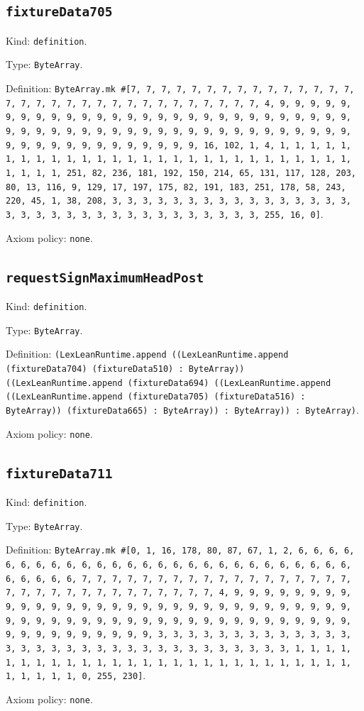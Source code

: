 \documentclass[11pt]{article}
\begin{document}
\subsection*{\texttt{fixtureData705}}
\noindent Kind: \texttt{definition}.\par
\noindent Type: \texttt{ByteArray}.\par
\noindent Definition: \texttt{ByteArray.mk \#[7, 7, 7, 7, 7, 7, 7, 7, 7, 7, 7, 7, 7, 7, 7, 7, 7, 7, 7, 7, 7, 7, 7, 7, 7, 7, 7, 7, 7, 7, 7, 7, 4, 9, 9, 9, 9, 9, 9, 9, 9, 9, 9, 9, 9, 9, 9, 9, 9, 9, 9, 9, 9, 9, 9, 9, 9, 9, 9, 9, 9, 9, 9, 9, 9, 9, 9, 9, 9, 9, 9, 9, 9, 9, 9, 9, 9, 9, 9, 9, 9, 9, 9, 9, 9, 9, 9, 9, 9, 9, 9, 9, 9, 9, 9, 9, 9, 16, 102, 1, 4, 1, 1, 1, 1, 1, 1, 1, 1, 1, 1, 1, 1, 1, 1, 1, 1, 1, 1, 1, 1, 1, 1, 1, 1, 1, 1, 1, 1, 1, 1, 1, 1, 251, 82, 236, 181, 192, 150, 214, 65, 131, 117, 128, 203, 80, 13, 116, 9, 129, 17, 197, 175, 82, 191, 183, 251, 178, 58, 243, 220, 45, 1, 38, 208, 3, 3, 3, 3, 3, 3, 3, 3, 3, 3, 3, 3, 3, 3, 3, 3, 3, 3, 3, 3, 3, 3, 3, 3, 3, 3, 3, 3, 3, 3, 3, 3, 3, 255, 16, 0]}.\par
\noindent Axiom policy: \texttt{none}.\par
\subsection*{\texttt{requestSignMaximumHeadPost}}
\noindent Kind: \texttt{definition}.\par
\noindent Type: \texttt{ByteArray}.\par
\noindent Definition: \texttt{(LexLeanRuntime.append ((LexLeanRuntime.append (fixtureData704) (fixtureData510) : ByteArray)) ((LexLeanRuntime.append (fixtureData694) ((LexLeanRuntime.append ((LexLeanRuntime.append (fixtureData705) (fixtureData516) : ByteArray)) (fixtureData665) : ByteArray)) : ByteArray)) : ByteArray)}.\par
\noindent Axiom policy: \texttt{none}.\par
\subsection*{\texttt{fixtureData711}}
\noindent Kind: \texttt{definition}.\par
\noindent Type: \texttt{ByteArray}.\par
\noindent Definition: \texttt{ByteArray.mk \#[0, 1, 16, 178, 80, 87, 67, 1, 2, 6, 6, 6, 6, 6, 6, 6, 6, 6, 6, 6, 6, 6, 6, 6, 6, 6, 6, 6, 6, 6, 6, 6, 6, 6, 6, 6, 6, 6, 6, 6, 6, 7, 7, 7, 7, 7, 7, 7, 7, 7, 7, 7, 7, 7, 7, 7, 7, 7, 7, 7, 7, 7, 7, 7, 7, 7, 7, 7, 7, 7, 7, 7, 7, 4, 9, 9, 9, 9, 9, 9, 9, 9, 9, 9, 9, 9, 9, 9, 9, 9, 9, 9, 9, 9, 9, 9, 9, 9, 9, 9, 9, 9, 9, 9, 9, 9, 9, 9, 9, 9, 9, 9, 9, 9, 9, 9, 9, 9, 9, 9, 9, 9, 9, 9, 9, 9, 9, 9, 9, 9, 9, 9, 9, 9, 9, 9, 9, 9, 3, 3, 3, 3, 3, 3, 3, 3, 3, 3, 3, 3, 3, 3, 3, 3, 3, 3, 3, 3, 3, 3, 3, 3, 3, 3, 3, 3, 3, 3, 3, 3, 1, 1, 1, 1, 1, 1, 1, 1, 1, 1, 1, 1, 1, 1, 1, 1, 1, 1, 1, 1, 1, 1, 1, 1, 1, 1, 1, 1, 1, 1, 1, 1, 0, 255, 230]}.\par
\noindent Axiom policy: \texttt{none}.\par
\end{document}
